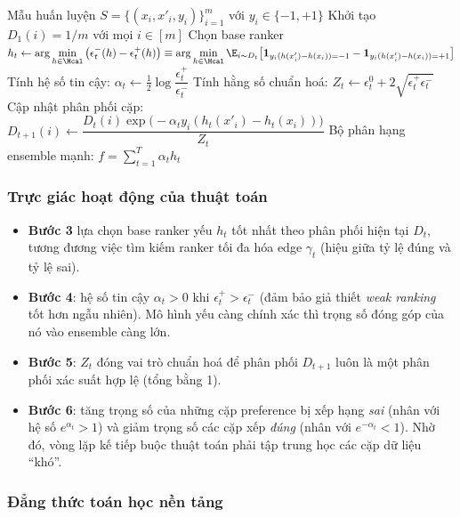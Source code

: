 \begin{algorithm}[H]
\caption{RankBoost}
\label{alg:rankboost}
\begin{algorithmic}[1]
\REQUIRE Mẫu huấn luyện $S = \{(x_i, x'_i, y_i)\}_{i=1}^m$ với $y_i \in \{-1, +1\}$
\STATE Khởi tạo $D_1(i) = 1/m$ với mọi $i \in [m]$
    \STATE Chọn base ranker $h_t \leftarrow \displaystyle\arg\min_{h \in \Hcal} \left( \epsilon^-_t(h) - \epsilon^+_t(h) \right) \equiv \displaystyle\arg\min_{h \in \Hcal} \E_{i \sim D_t}\bigl[\mathbf{1}_{y_i(h(x'_i)-h(x_i)) = -1} - \mathbf{1}_{y_i(h(x'_i)-h(x_i)) = +1}\bigr]$
    \STATE Tính hệ số tin cậy: $\alpha_t \leftarrow \frac{1}{2}\log\dfrac{\epsilon^+_t}{\epsilon^-_t}$
    \STATE Tính hằng số chuẩn hoá: $Z_t \leftarrow \epsilon^0_t + 2\sqrt{\epsilon^+_t \epsilon^-_t}$
    \STATE Cập nhật phân phối cặp: $D_{t+1}(i) \leftarrow \dfrac{D_t(i) \exp\bigl(-\alpha_t y_i(h_t(x'_i)-h_t(x_i))\bigr)}{Z_t}$
\ENDFOR
\RETURN Bộ phân hạng ensemble mạnh: $f = \sum_{t=1}^T \alpha_t h_t$
\end{algorithmic}
\end{algorithm}

\subsubsection{Trực giác hoạt động của thuật toán}

\begin{itemize}
    \item \textbf{Bước 3} lựa chọn base ranker yếu $h_t$ tốt nhất theo phân phối hiện tại $D_t$, tương đương việc tìm kiếm ranker tối đa hóa edge $\gamma_t$ (hiệu giữa tỷ lệ đúng và tỷ lệ sai).
    \item \textbf{Bước 4}: hệ số tin cậy $\alpha_t > 0$ khi $\epsilon^+_t > \epsilon^-_t$ (đảm bảo giả thiết \textit{weak ranking} tốt hơn ngẫu nhiên). Mô hình yếu càng chính xác thì trọng số đóng góp của nó vào ensemble càng lớn.
    \item \textbf{Bước 5}: $Z_t$ đóng vai trò chuẩn hoá để phân phối $D_{t+1}$ luôn là một phân phối xác suất hợp lệ (tổng bằng 1).
    \item \textbf{Bước 6}: tăng trọng số của những cặp preference bị xếp hạng \textit{sai} (nhân với hệ số $e^{\alpha_t} > 1$) và giảm trọng số các cặp xếp \textit{đúng} (nhân với $e^{-\alpha_t} < 1$). Nhờ đó, vòng lặp kế tiếp buộc thuật toán phải tập trung học các cặp dữ liệu ``khó''.
\end{itemize}

\subsubsection{Đẳng thức toán học nền tảng}

